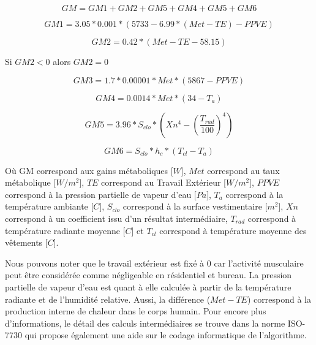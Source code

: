 \begin{equation}
GM=GM1+GM2+GM5+GM4+GM5+GM6
\label{GM}
\end{equation}

\begin{equation}
GM1=3.05*0.001*(5733-6.99*(Met-TE)-PPVE)
\label{GM1}
\end{equation}

\begin{equation}
GM2=0.42*(Met-TE-58.15)
\label{GM2}
\end{equation}
\begin{center}
Si $GM2<0$ alors $GM2=0$
\end{center}

\begin{equation}
GM3=1.7*0.00001*Met*(5867-PPVE)
\label{GM3}
\end{equation}

\begin{equation}
GM4=0.0014*Met*(34-T_{a})
\label{GM4}
\end{equation}

\begin{equation}
GM5=3.96*S_{clo}*(Xn^{4}-(\frac{T_{rad}}{100})^4)
\label{GM5}
\end{equation}

\begin{equation}
GM6=S_{clo}*h_{c}*(T_{cl}-T_{a})
\label{GM6}
\end{equation}

Où GM correspond aux gains métaboliques [$W$], $Met$ correspond au taux métabolique [$W/m^{2}$], $TE$ correspond au Travail Extérieur [$W/m^{2}$], $PPVE$ correspond à la pression partielle de vapeur d'eau [$Pa$], $T_{a}$ correspond à la température ambiante [\degres$C$], $S_{clo}$ correspond à la surface vestimentaire [$m^{2}$], $Xn$ correspond à un coefficient issu d'un résultat intermédiaire, $T_{rad}$ correspond à température radiante moyenne [\degres$C$] et $T_{cl}$ correspond à température moyenne des vêtements [\degres$C$]. 

Nous pouvons noter que le travail extérieur est fixé à 0 car l'activité musculaire peut être considérée comme négligeable en résidentiel et bureau. La pression partielle de vapeur d'eau est quant à elle calculée à partir de la température radiante et de l'humidité relative. Aussi, la différence ($Met-TE$) correspond à la production interne de chaleur dans le corps humain. Pour encore plus d'informations, le détail des calculs intermédiaires se trouve dans la norme ISO-7730 \cite{ISO7730} qui propose également une aide sur le codage informatique de l'algorithme.

